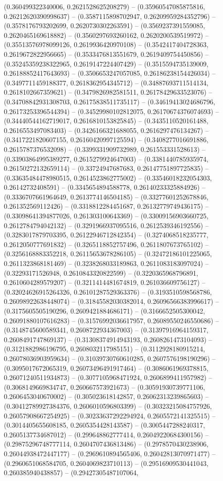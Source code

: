 (0.360499322340006, 0.2621528625208279) -- (0.35960547085875816, 0.26212620390998637) -- (0.3587115898702947, 0.26209959284352796) -- (0.3578176793202699, 0.2620730302263591) -- (0.3569237391559085, 0.2620465169618882) -- (0.3560297693260162, 0.2620200539519972) -- (0.35513576978099126, 0.2619936420970108) -- (0.3542417404728363, 0.2619672822956665) -- (0.3533476813551679, 0.2619409754450856) -- (0.35245359238322965, 0.2619147224407429) -- (0.3515594735139009, 0.26188852417643693) -- (0.3506653247057085, 0.26186238154426034) -- (0.3497711459188377, 0.2618362954345712) -- (0.34887693711514134, 0.2618102667359621) -- (0.3479826982581511, 0.26178429633523076) -- (0.34708842931308703, 0.26175838511735117) -- (0.34619413024686796, 0.26173253396544394) -- (0.34529980102812075, 0.26170674376074693) -- (0.34440544162719017, 0.2616810153825845) -- (0.3435110520161488, 0.2616553497083403) -- (0.3426166321688055, 0.2616297476134267) -- (0.3417221820607155, 0.26160420997125594) -- (0.3408277016691886, 0.2615787376532098) -- (0.3399331909732989, 0.261553331528613) -- (0.33903864995389277, 0.2615279924647003) -- (0.3381440785935974, 0.26150272132659114) -- (0.33724947687683, 0.26147751897725835) -- (0.33635484478980515, 0.2614523862775002) -- (0.33546018232054303, 0.26142732408591) -- (0.3345654894588778, 0.26140233325884926) -- (0.3336707661964649, 0.2613774146504185) -- (0.33277601252678846, 0.261352569112426) -- (0.3318812284451687, 0.26132779749436175) -- (0.33098641394877026, 0.261303100643369) -- (0.33009156903660725, 0.2612784794042132) -- (0.3291966937095516, 0.2612539346192556) -- (0.3283017879703395, 0.26122946712842354) -- (0.3274068518235777, 0.2612050777691832) -- (0.3265118852757496, 0.2611807673765102) -- (0.3256168883352218, 0.26115653678286105) -- (0.32472186101225065, 0.2611323868181469) -- (0.3238268033189863, 0.2611083183097024) -- (0.32293171526948, 0.2610843320822599) -- (0.3220365968796891, 0.2610604289579207) -- (0.3211414481674819, 0.261036609756127) -- (0.32024626915264326, 0.26101287529363376) -- (0.3193510598568786, 0.26098922638448074) -- (0.31845582030382014, 0.26096566383996617) -- (0.3175605505190296, 0.2609421884686171) -- (0.3166652505300042, 0.26091880107616283) -- (0.31576992036617957, 0.26089550246550686) -- (0.3148745600589341, 0.2608722934367003) -- (0.31397916964159317, 0.2608491747869137) -- (0.31308374914943193, 0.2608261473104093) -- (0.3121882986196795, 0.2608032117985151) -- (0.3112928180915214, 0.26078036903959634) -- (0.31039730760610285, 0.2607576198190296) -- (0.3095017672065319, 0.26073496491917464) -- (0.3086061969378815, 0.26071240511934873) -- (0.3077105968471924, 0.2606899411957982) -- (0.3068149669834747, 0.260667573921673) -- (0.30591930739771106, 0.2606453040670002) -- (0.305023618142857, 0.26062313239865603) -- (0.30412789927384376, 0.2606010596803399) -- (0.30323215084757926, 0.26057908667254925) -- (0.30233637292294924, 0.2605572141325515) -- (0.3014405655608185, 0.2605354428143587) -- (0.3005447288240317, 0.2605137734687012) -- (0.299648862777414, 0.26049220684300156) -- (0.29875296748777114, 0.2604707436813486) -- (0.2978570430238906, 0.26044938472447177) -- (0.2969610894565406, 0.26042813070971477) -- (0.2960651068584705, 0.2604069823710113) -- (0.29516909530441043, 0.260385940438857) -- (0.29427305487107064, 